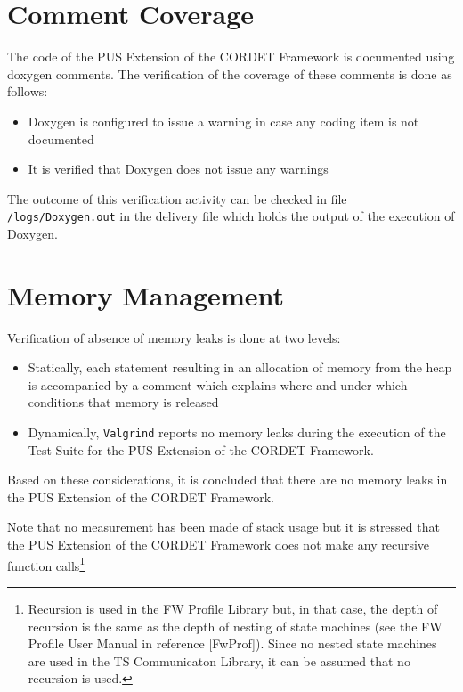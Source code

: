 \documentclass{pnp_article}
\begin{document}
\section{Comment Coverage}\label{sec:svrCommCov}
The code of the PUS Extension of the CORDET Framework is documented using doxygen comments. The verification of the coverage of these comments is done as follows:

\begin{itemize}
\item Doxygen is configured to issue a warning in case any coding item is not documented
\item It is verified that Doxygen does not issue any warnings
\end{itemize}

The outcome of this verification activity can be checked in file \texttt{/logs/Doxygen.out} in the delivery file which holds the output of the execution of Doxygen.


\section{Memory Management}\label{sec:svrMemMng}
Verification of absence of memory leaks is done at two levels:

\begin{itemize}
\item Statically, each statement resulting in an allocation of memory from the heap is accompanied by a comment which explains where and under which conditions that memory is released
\item Dynamically, \texttt{Valgrind} reports no memory leaks during the execution of the Test Suite for the PUS Extension of the CORDET Framework.
\end{itemize}

Based on these considerations, it is concluded that there are no memory leaks in the PUS Extension of the CORDET Framework.

Note that no measurement has been made of stack usage but it is stressed that the PUS Extension of the CORDET Framework does not make any recursive function calls\footnote{Recursion is used in the FW Profile Library but, in that case, the depth of recursion is the same as the depth of nesting of state machines (see the FW Profile User Manual in reference [FwProf]). Since no nested state machines are used in the TS Communicaton Library, it can be assumed that no recursion is used.}
\end{document}
